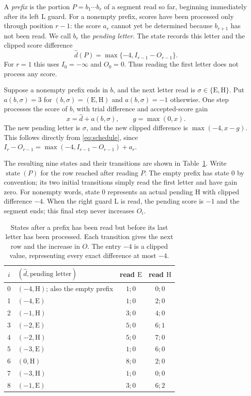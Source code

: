 \documentclass[11pt,a4paper]{article}
\theoremstyle{definition}
\theoremstyle{remark}
\newcommand{\E}{\mathrm E}
\newcommand{\HH}{\mathrm H}
\newcommand{\LL}{\mathrm L}
\DeclareMathOperator{\state}{state}
\begin{document}
A \emph{prefix} is the portion $P=b_1\cdots b_r$ of a segment read so far, beginning immediately after its left $\LL$ guard. For a nonempty prefix, scores have been processed only through position $r-1$: the score $a_r$ cannot yet be determined because $b_{r+1}$ has not been read. We call $b_r$ the \emph{pending letter}. The state records this letter and the clipped score difference
\[
\widehat d(P)=\max\{-4,I_{r-1}-O_{r-1}\}.
\]
For $r=1$ this uses $I_0=-\infty$ and $O_0=0$. Thus reading the first letter does not process any score.

Suppose a nonempty prefix ends in $b$, and the next letter read is $\sigma\in\{\E,\HH\}$. Put $a(b,\sigma)=3$ for $(b,\sigma)=(\E,\HH)$ and $a(b,\sigma)=-1$ otherwise. One step processes the score of $b$, with trial difference and accepted-score gain
\begin{equation}\label{eq:state-update}
x=\widehat d+a(b,\sigma),\qquad g=\max(0,x).
\end{equation}
The new pending letter is $\sigma$, and the new clipped difference is $\max(-4,x-g)$. This follows directly from \eqref{eq:schedule}, since $I_r-O_{r-1}=\max(-4,I_{r-1}-O_{r-1})+a_r$.

The resulting nine states and their transitions are shown in Table~\ref{tab:prefix}. Write $\state(P)$ for the row reached after reading $P$. The empty prefix has state 0 by convention; its two initial transitions simply read the first letter and have gain zero. For nonempty words, state 0 represents an actual pending $\HH$ with clipped difference $-4$. When the right guard $\LL$ is read, the pending score is $-1$ and the segment ends; this final step never increases $O_i$.

\begin{table}[htbp]
\centering
\caption{States after a prefix has been read but before its last letter has been processed. Each transition gives the next row and the increase in $O$. The entry $-4$ is a clipped value, representing every exact difference at most $-4$.}\label{tab:prefix}
\begin{tabular}{clcc}
\toprule
$i$&$(\widehat d,\text{pending letter})$&read $\E$&read $\HH$\\
\midrule
0&$(-4,\HH)$; also the empty prefix&$1;0$&$0;0$\\
1&$(-4,\E)$&$1;0$&$2;0$\\
2&$(-1,\HH)$&$3;0$&$4;0$\\
3&$(-2,\E)$&$5;0$&$6;1$\\
4&$(-2,\HH)$&$5;0$&$7;0$\\
5&$(-3,\E)$&$1;0$&$6;0$\\
6&$(0,\HH)$&$8;0$&$2;0$\\
7&$(-3,\HH)$&$1;0$&$0;0$\\
8&$(-1,\E)$&$3;0$&$6;2$\\
\bottomrule
\end{tabular}
\end{table}
\end{document}
